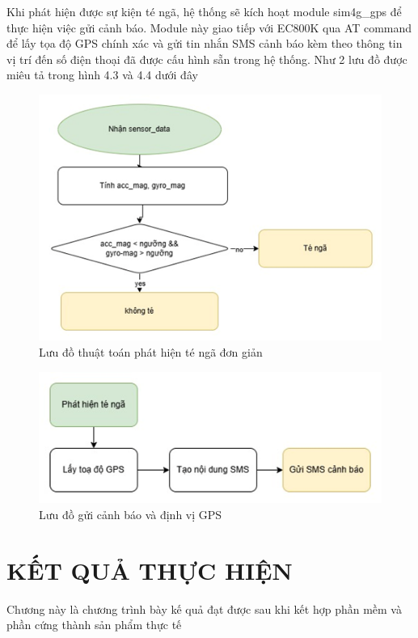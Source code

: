 \documentclass[a4paper,12pt]{report}
\begin{document}
	Khi phát hiện được sự kiện té ngã, hệ thống sẽ kích hoạt module sim4g\_gps để thực hiện việc gửi cảnh báo. Module này giao tiếp với EC800K qua AT command để lấy tọa độ GPS chính xác và gửi tin nhắn SMS cảnh báo kèm theo thông tin vị trí đến số điện thoại đã được cấu hình sẵn trong hệ thống. Như 2 lưu đồ được miêu tả trong hình 4.3 và 4.4 dưới đây
	\begin{figure}[h]
		\centering
		\includegraphics[width=\textwidth]{luu_do_phat_hien_te_nga_don_gian.png}
		\caption{Lưu đồ thuật toán phát hiện té ngã đơn giản}
		\label{fig:fall_detection_algorithm}
	\end{figure}
	
	\begin{figure}[h]
		\centering
		\includegraphics[width=\textwidth]{luu_do_gui_canh_bao_dinh_vi_gps.png}
		\caption{Lưu đồ gửi cảnh báo và định vị GPS}
		\label{fig:gps_alert_flowchart}
	\end{figure}
	
	
	
	
	\chapter{KẾT QUẢ THỰC HIỆN}
	Chương này là chương trình bày kế quả đạt được sau khi kết hợp phần mềm và phần cứng thành sản phẩm thực tế
\end{document}
